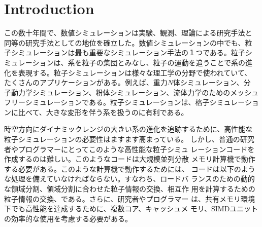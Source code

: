 \documentclass[12pt,a4paper]{jarticle}
\newcommand{\redtext}[1]{\textcolor{red}{#1}}
\begin{document}
\section{Introduction}

この数十年間で、数値シミュレーションは実験、観測、理論による研究手法と
同等の研究手法としての地位を確立した。数値シミュレーションの中でも、粒
子シミュレーションは最も重要なシミュレーション手法の１つである。粒子シ
ミュレーションは、系を粒子の集団とみなし、粒子の運動を追うことで系の進
化を表現する。粒子シミュレーションは様々な理工学の分野で使われていて、
たくさんのアプリケーションがある。例えば、重力$N$体シミュレーション、分
子動力学シミュレーション、粉体シミュレーション、流体力学のためのメッシュ
フリーシミュレーションである。粒子シミュレーションは、格子シミュレーショ
ンに比べて、大きな変形を伴う系を扱うのに有利である。



時空方向にダイナミックレンジの大きい系の進化を追跡するために、高性能な
粒子シミュレーションの必要性はますます高まっている。
しかし、普通の研究者やプログラマーにとってこのような高性能な粒子シミュ
レーションコードを作成するのは難しい。このようなコードは大規模並列分散
メモリ計算機で動作する必要がある。このような計算機で動作するためには、
コードは以下のような処理を備えていなければならない。すなわち、ロードバ
ランスのための動的な領域分割、領域分割に合わせた粒子情報の交換、相互作
用を計算するための粒子情報の交換、である。さらに、研究者やプログラマー
は、共有メモリ環境下でも高性能を達成するために、複数コア、キャッシュメ
モリ、SIMDユニットの効率的な使用を考慮する必要がある。
\end{document}
